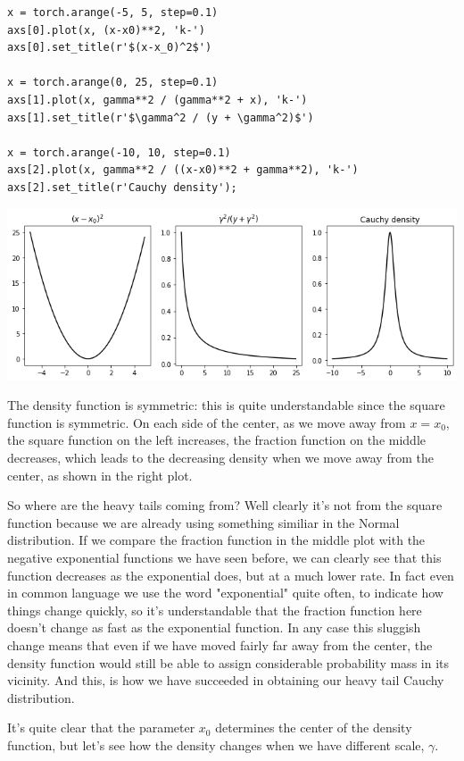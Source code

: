 \documentclass[11pt]{article}
\begin{document}
\begin{enumerate}
\begin{verbatim}
x = torch.arange(-5, 5, step=0.1)
axs[0].plot(x, (x-x0)**2, 'k-')
axs[0].set_title(r'$(x-x_0)^2$')

x = torch.arange(0, 25, step=0.1)
axs[1].plot(x, gamma**2 / (gamma**2 + x), 'k-')
axs[1].set_title(r'$\gamma^2 / (y + \gamma^2)$')

x = torch.arange(-10, 10, step=0.1)
axs[2].plot(x, gamma**2 / ((x-x0)**2 + gamma**2), 'k-')
axs[2].set_title(r'Cauchy density');
\end{verbatim}

\begin{center}
\includegraphics[width=.9\linewidth]{./.ob-jupyter/931278c6790dd7f9de71b96b7fb99a37dae25720.png}
\end{center}

The density function is symmetric: this is quite understandable since the square function is symmetric. On each side of the center, as we move away from \(x=x_0\), the square function on the left increases, the fraction function on the middle decreases, which leads to the decreasing density when we move away from the center, as shown in the right plot.

So where are the heavy tails coming from? Well clearly it's not from the square function because we are already using something similiar in the Normal distribution. If we compare the fraction function in the middle plot with the negative exponential functions we have seen before, we can clearly see that this function decreases as the exponential does, but at a much lower rate. In fact even in common language we use the word "exponential" quite often, to indicate how things change quickly, so it's understandable that the fraction function here doesn't change as fast as the exponential function. In any case this sluggish change means that even if we have moved fairly far away from the center, the density function would still be able to assign considerable probability mass in its vicinity. And this, is how we have succeeded in obtaining our heavy tail Cauchy distribution.

It's quite clear that the parameter \(x_0\) determines the center of the density function, but let's see how the density changes when we have different scale, \(\gamma\).


\end{enumerate}
\end{document}
